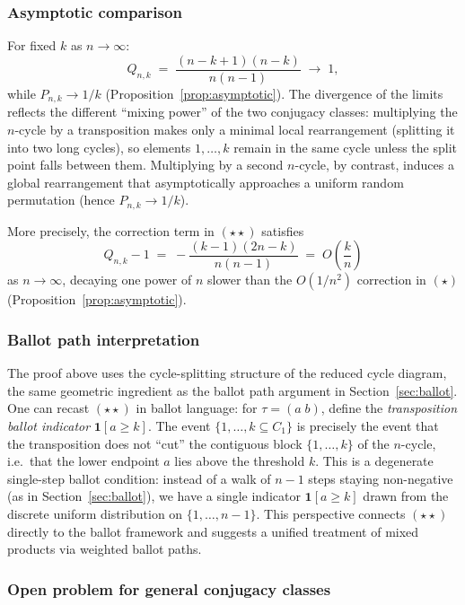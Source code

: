 \documentclass[12pt,a4paper]{article}
\theoremstyle{definition}
\begin{document}
\subsubsection*{Asymptotic comparison}

For fixed $k$ as $n\to\infty$:
\[
Q_{n,k} \;=\; \frac{(n-k+1)(n-k)}{n(n-1)} \;\longrightarrow\; 1,
\]
while $P_{n,k}\to 1/k$ (Proposition~\ref{prop:asymptotic}).  The
divergence of the limits reflects the different ``mixing power'' of the
two conjugacy classes: multiplying the $n$-cycle by a transposition
makes only a minimal local rearrangement (splitting it into two long
cycles), so elements $1,\dots,k$ remain in the same cycle unless the
split point falls between them.  Multiplying by a second $n$-cycle, by
contrast, induces a global rearrangement that asymptotically approaches
a uniform random permutation (hence $P_{n,k}\to 1/k$).

More precisely, the correction term in $(\star\!\star)$ satisfies
\[
Q_{n,k} - 1 \;=\; -\frac{(k-1)(2n-k)}{n(n-1)} \;=\; O\!\left(\frac{k}{n}\right)
\]
as $n\to\infty$, decaying one power of $n$ slower than the
$O(1/n^2)$ correction in $(\star)$ (Proposition~\ref{prop:asymptotic}).

\subsubsection*{Ballot path interpretation}

The proof above uses the cycle-splitting structure of the reduced cycle
diagram, the same geometric ingredient as the ballot path argument in
Section~\ref{sec:ballot}.  One can recast $(\star\!\star)$ in ballot
language: for $\tau=(a\;b)$, define the \emph{transposition ballot
indicator} $\mathbf{1}[a\ge k]$.  The event $\{1,\dots,k\subseteq C_1\}$
is precisely the event that the transposition does not ``cut'' the
contiguous block $\{1,\dots,k\}$ of the $n$-cycle, i.e.\ that the
lower endpoint $a$ lies above the threshold $k$.  This is a
degenerate single-step ballot condition: instead of a walk of $n-1$
steps staying non-negative (as in Section~\ref{sec:ballot}), we have a
single indicator $\mathbf{1}[a\ge k]$ drawn from the discrete
uniform distribution on $\{1,\dots,n-1\}$.  This perspective
connects $(\star\!\star)$ directly to the ballot framework and
suggests a unified treatment of mixed products via weighted ballot
paths.

\subsubsection*{Open problem for general conjugacy classes}
\end{document}
